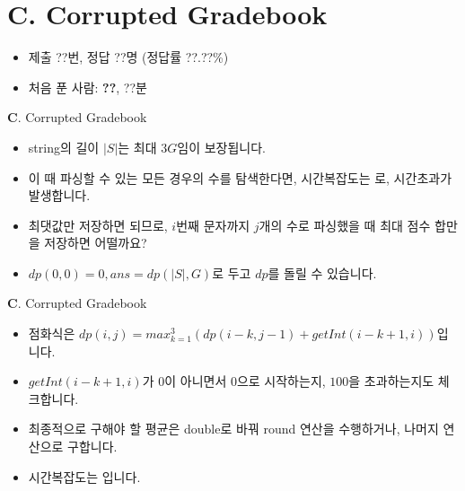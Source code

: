 \section{C. Corrupted Gradebook}

\begin{frame} %
    \begin{itemize}
        \item 제출 ??번, 정답 ??명 (정답률 ??.??\%)
        \item 처음 푼 사람: \textbf{??}, ??분
    \end{itemize}
\end{frame}

\begin{frame}{\textbf{C}. Corrupted Gradebook}
    \begin{itemize}
        \item string의 길이 $|S|$는 최대 $3G$임이 보장됩니다.
        \item 이 때 파싱할 수 있는 모든 경우의 수를 탐색한다면, 시간복잡도는 로, 시간초과가 발생합니다.
        \item 최댓값만 저장하면 되므로, $i$번째 문자까지 $j$개의 수로 파싱했을 때 최대 점수 합만을 저장하면 어떨까요?
        \item $dp(0,0)=0, ans=dp(|S|,G)$로 두고 $dp$를 돌릴 수 있습니다.
    \end{itemize}
\end{frame}

\begin{frame}{\textbf{C}. Corrupted Gradebook}
    \begin{itemize}
        \item 점화식은 $dp(i,j)=max_{k=1}^{3}(dp(i-k,j-1)+getInt(i-k+1,i))$입니다.
        \item $getInt(i-k+1,i)$가 $0$이 아니면서 $0$으로 시작하는지, $100$을 초과하는지도 체크합니다.
        \item 최종적으로 구해야 할 평균은 double로 바꿔 round 연산을 수행하거나, 나머지 연산으로 구합니다.
        \item 시간복잡도는 입니다.
    \end{itemize}
\end{frame}